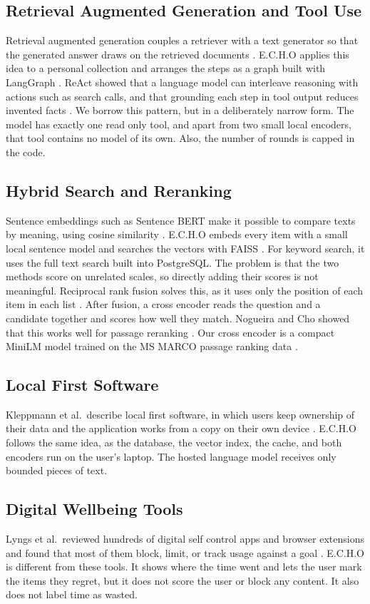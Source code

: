\documentclass[conference]{IEEEtran}
\begin{document}
\subsection{Retrieval Augmented Generation and Tool Use}
Retrieval augmented generation couples a retriever with a text generator so that the generated answer draws on the retrieved documents \cite{b4}. E.C.H.O applies this idea to a personal collection and arranges the steps as a graph built with LangGraph \cite{b5}. ReAct showed that a language model can interleave reasoning with actions such as search calls, and that grounding each step in tool output reduces invented facts \cite{b13}. We borrow this pattern, but in a deliberately narrow form. The model has exactly one read only tool, and apart from two small local encoders, that tool contains no model of its own. Also, the number of rounds is capped in the code.

\subsection{Hybrid Search and Reranking}
Sentence embeddings such as Sentence BERT make it possible to compare texts by meaning, using cosine similarity \cite{b6}. E.C.H.O embeds every item with a small local sentence model \cite{b16} and searches the vectors with FAISS \cite{b8}. For keyword search, it uses the full text search built into PostgreSQL. The problem is that the two methods score on unrelated scales, so directly adding their scores is not meaningful. Reciprocal rank fusion solves this, as it uses only the position of each item in each list \cite{b9}. After fusion, a cross encoder reads the question and a candidate together and scores how well they match. Nogueira and Cho showed that this works well for passage reranking \cite{b10}. Our cross encoder is a compact MiniLM \cite{b7} model trained on the MS MARCO passage ranking data \cite{b11}.

\subsection{Local First Software}
Kleppmann et al.\ describe local first software, in which users keep ownership of their data and the application works from a copy on their own device \cite{b12}. E.C.H.O follows the same idea, as the database, the vector index, the cache, and both encoders run on the user's laptop. The hosted language model receives only bounded pieces of text.

\subsection{Digital Wellbeing Tools}
Lyngs et al.\ reviewed hundreds of digital self control apps and browser extensions and found that most of them block, limit, or track usage against a goal \cite{b14}. E.C.H.O is different from these tools. It shows where the time went and lets the user mark the items they regret, but it does not score the user or block any content. It also does not label time as wasted.
\end{document}
